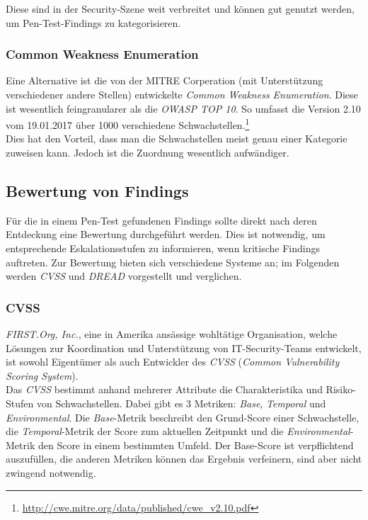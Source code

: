 		Diese sind in der Security-Szene weit verbreitet und können gut genutzt werden, um Pen-Test-Findings zu kategorisieren.
		
		\subsubsection{Common Weakness Enumeration}
		Eine Alternative ist die von der MITRE Corperation (mit Unterstützung verschiedener andere Stellen) entwickelte \textit{Common Weakness Enumeration}. Diese ist wesentlich feingranularer als die \textit{OWASP TOP 10}. So umfasst die Version 2.10 vom 19.01.2017 über 1000 verschiedene Schwachstellen.\footnote{\url{http://cwe.mitre.org/data/published/cwe_v2.10.pdf}}\cite{MITRECWE}\\
		
		Dies hat den Vorteil, dass man die Schwachstellen meist genau einer Kategorie zuweisen kann. Jedoch ist die Zuordnung wesentlich aufwändiger.
			
	\subsection{Bewertung von Findings}
	Für die in einem Pen-Test gefundenen Findings sollte direkt nach deren Entdeckung eine Bewertung durchgeführt werden. Dies ist notwendig, um entsprechende Eskalationsstufen zu informieren, wenn kritische Findings auftreten. Zur Bewertung bieten sich verschiedene Systeme an; im Folgenden werden \textit{CVSS} und \textit{DREAD} vorgestellt und verglichen.
	
			\subsubsection{CVSS}
			\textit{FIRST.Org, Inc.}, eine in Amerika ansässige wohltätige Organisation, welche Lösungen zur Koordination und Unterstützung von IT-Security-Teams entwickelt, ist sowohl Eigentümer als auch Entwickler des \textit{CVSS} (\textit{Common Vulnerability Scoring System}).\\
			
			Das \textit{CVSS} bestimmt anhand mehrerer Attribute die Charakteristika und Risiko-Stufen von Schwachstellen. Dabei gibt es 3 Metriken: \textit{Base}, \textit{Temporal} und \textit{Environmental}. Die \textit{Base}-Metrik beschreibt den Grund-Score einer Schwachstelle, die \textit{Temporal}-Metrik der Score zum aktuellen Zeitpunkt und die  \textit{Environmental}-Metrik den Score in einem bestimmten Umfeld. Der Base-Score ist verpflichtend auszufüllen, die anderen Metriken können das Ergebnis verfeinern, sind aber nicht zwingend notwendig.\cite{FIRSTCVSS}\\
			
